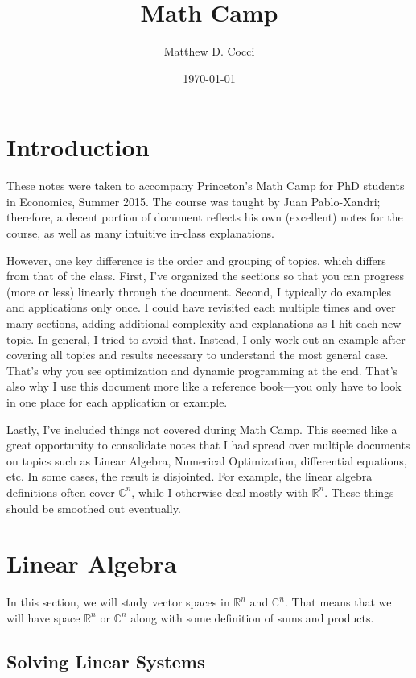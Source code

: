 \documentclass[12pt]{article}
\author{Matthew D. Cocci}
\title{Math Camp}
\date{\today}
\numberwithin{equation}{section} %
\theoremstyle{plain}
\theoremstyle{definition}
\theoremstyle{remark}
\newcommand{\Rn}{\mathbb{R}^n}
\newcommand{\Cn}{\mathbb{C}^n}
\begin{document}
\maketitle

\tableofcontents

\clearpage
\section{Introduction}

These notes were taken to accompany Princeton's Math Camp for PhD
students in Economics, Summer 2015. The course was taught by Juan
Pablo-Xandri; therefore, a decent portion of document reflects his own
(excellent) notes for the course, as well as many intuitive in-class
explanations.

However, one key difference is the order and grouping of topics, which
differs from that of the class. First, I've organized the sections so
that you can progress (more or less) linearly through the document.
Second, I typically do examples and applications only once. I could have
revisited each multiple times and over many sections, adding additional
complexity and explanations as I hit each new topic. In general, I tried
to avoid that. Instead, I only work out an example after covering all
topics and results necessary to understand the most general case.
That's why you see optimization and dynamic programming at the end.
That's also why I use this document more like a reference book---you
only have to look in one place for each application or example.

Lastly, I've included things not covered during Math Camp. This seemed
like a great opportunity to consolidate notes that I had spread over
multiple documents on topics such as Linear Algebra, Numerical
Optimization, differential equations, etc. In some cases, the result is
disjointed. For example, the linear algebra definitions often cover
$\Cn$, while I otherwise deal mostly with $\Rn$. These things should be
smoothed out eventually.

\clearpage
\section{Linear Algebra}

In this section, we will study vector spaces in $\Rn$ and $\Cn$.  That
means that we will have space $\Rn$ or $\Cn$ along with some definition
of sums and products.

\subsection{Solving Linear Systems}
\end{document}
